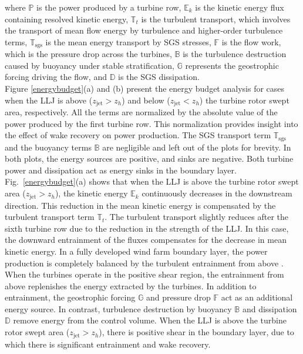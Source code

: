 \documentclass[%
 aip,
 amsmath,amssymb,
reprint,
twocolumn,%
author-numerical,%
]{revtex4-1}
\begin{document}
{{\noindent where $\mathbb{P}$ is the power produced by a turbine row, $\mathbb{E}_k$ is the kinetic energy flux containing resolved kinetic energy, $\mathbb{T}_t$ is the turbulent transport, which involves the transport of mean flow energy by turbulence \cite{lum72} and higher-order turbulence terms, $\mathbb{T}_\text{sgs}$ is the mean energy transport by SGS stresses, $\mathbb{F}$ is the flow work, which is the pressure drop across the turbines, $\mathbb{B}$ is the turbulence destruction caused by buoyancy under stable stratification, $\mathbb{G}$ represents the geostrophic forcing driving the flow, and $\mathbb{D}$ is the SGS dissipation.\\
\indent Figure \ref{energybudget}(a) and (b) present the energy budget analysis for cases when the LLJ is above ($z_\text{jet} > z_h$) and below ($ z_\text{jet} < z_h$) the turbine rotor swept area, respectively. All the terms are normalized by the absolute value of the power produced by the first turbine row. This normalization provides insight into the effect of wake recovery on power production. {\color{black} The SGS transport term $\mathbb{T}_\text{sgs}$ and the buoyancy terms $\mathbb{B}$ are negligible and left out of the plots for brevity.} In both plots, the energy sources are positive, and sinks are negative. Both turbine power and dissipation act as energy sinks in the boundary layer. Fig.\ \ref{energybudget}(a) shows that when the LLJ is above the turbine rotor swept area ($z_\text{jet} > z_h$), the kinetic energy $\mathbb{E}_k$ continuously decreases in the downstream direction. This reduction in the mean kinetic energy is compensated by the turbulent transport term $\mathbb{T}_t$. The turbulent transport slightly reduces after the sixth turbine row due to the reduction in the strength of the LLJ. In this case, the downward entrainment of the fluxes compensates for the decrease in mean kinetic energy. In a fully developed wind farm boundary layer, the power production is completely balanced by the turbulent entrainment from above \cite{cal10, cal10b}. When the turbines operate in the positive shear region, the entrainment from above replenishes the energy extracted by the turbines. In addition to entrainment, the geostrophic forcing $\mathbb{G}$ and pressure drop $\mathbb{F}$ act as an additional energy source. In contrast, turbulence destruction by buoyancy $\mathbb{B}$ and dissipation $\mathbb{D}$ remove energy from the control volume. {\color{black} When the LLJ is above the turbine rotor swept area ($z_\text{jet} > z_h$),} there is positive shear in the boundary layer, due to which there is significant entrainment and wake recovery.

}}
\end{document}

